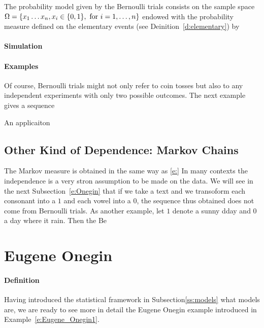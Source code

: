 	\begin{definition}
		The probability model given by the Bernoulli trials consists on the sample space $\Omega = \{x_1\ldots x_n , x_i \in \{0,1\}, \text{ for $ i = 1, \ldots, n$}\}$ endowed with the probability measure defined on the elementary events (see Deinition~\ref{d:elementary}) by  
	\end{definition}

	\paragraph{Simulation}
	\paragraph{Examples}
	Of course, Bernoulli trials might not only refer to coin tosses but also to any independent experiments with only two possible outcomes. The next example gives a sequence
	\begin{example}
	An applicaiton
	\end{example}
	\subsection{Other Kind of Dependence: Markov Chains}
		\label{ss:Markov}
		The Markov measure is obtained in the same way as \eqref{e:}
	In many contexts the independence is a very stron assumption to be made on the data. We will see in the next Subsection~\ref{e:Onegin} that if we take a text and we transoform each consonant into a $1$ and each vowel into a 0, the sequence thus obtained does not come from  Bernoulli trials. As another example, let $1$ denote a sunny dday and 0 a day where it rain. Then the Be
	
	\section{ Eugene Onegin}
	\paragraph{Definition}
	Having introduced the statistical framework in Subsection\ref{ss:models} what models are, we are ready to see more in detail the Eugene Onegin example introduced in Example~\ref{e:Eugene_Onegin1}.  


